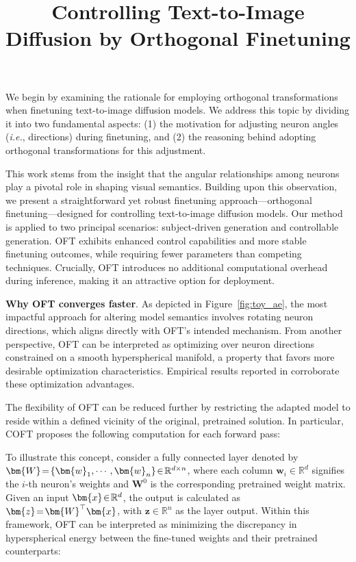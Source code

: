 \title{Controlling Text-to-Image Diffusion by Orthogonal Finetuning}
We begin by examining the rationale for employing orthogonal transformations when finetuning text-to-image diffusion models. We address this topic by dividing it into two fundamental aspects: (1) the motivation for adjusting neuron angles (\emph{i.e.}, directions) during finetuning, and (2) the reasoning behind adopting orthogonal transformations for this adjustment.

This work stems from the insight that the angular relationships among neurons play a pivotal role in shaping visual semantics. Building upon this observation, we present a straightforward yet robust finetuning approach—orthogonal finetuning—designed for controlling text-to-image diffusion models. Our method is applied to two principal scenarios: subject-driven generation and controllable generation. OFT exhibits enhanced control capabilities and more stable finetuning outcomes, while requiring fewer parameters than competing techniques. Crucially, OFT introduces no additional computational overhead during inference, making it an attractive option for deployment.

\textbf{Why OFT converges faster}. As depicted in Figure~\ref{fig:toy_ae}, the most impactful approach for altering model semantics involves rotating neuron directions, which aligns directly with OFT’s intended mechanism. From another perspective, OFT can be interpreted as optimizing over neuron directions constrained on a smooth hyperspherical manifold, a property that favors more desirable optimization characteristics. Empirical results reported in \cite{liu2021orthogonal} corroborate these optimization advantages.

The flexibility of OFT can be reduced further by restricting the adapted model to reside within a defined vicinity of the original, pretrained solution. In particular, COFT proposes the following computation for each forward pass:

To illustrate this concept, consider a fully connected layer denoted by $\thickmuskip=2mu \medmuskip=2mu \bm{W}=\{\bm{w}_1,\cdots,\bm{w}_n\}\in\mathbb{R}^{d\times n}$, where each column $\bm{w}_i\in\mathbb{R}^{d}$ signifies the $i$-th neuron's weights and $\bm{W}^0$ is the corresponding pretrained weight matrix. Given an input $\thickmuskip=2mu \medmuskip=2mu \bm{x}\in\mathbb{R}^d$, the output is calculated as $\thickmuskip=2mu \medmuskip=2mu \bm{z}=\bm{W}^\top\bm{x}$, with $\bm{z}\in\mathbb{R}^n$ as the layer output. Within this framework, OFT can be interpreted as minimizing the discrepancy in hyperspherical energy between the fine-tuned weights and their pretrained counterparts:

